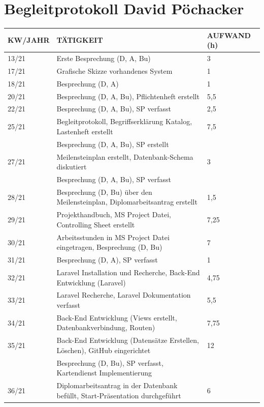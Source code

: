 \section{Begleitprotokoll David Pöchacker}
\begin{table}[h]
	\begin{tabular}{|l|l|l|}
		\hline
		\textbf{KW/JAHR} &     \textbf{TÄTIGKEIT}  & 	\textbf{AUFWAND (h)}    \\ \hline
		
13/21   & Erste Besprechung (D, A, Bu) & 3 	\\ \hline
17/21   & Grafische Skizze vorhandenes System  & 1 	\\ \hline
18/21   & Besprechung (D, A)  & 1 	\\ \hline
20/21   & Besprechung (D, A, Bu), Pflichtenheft erstellt & 5,5 	\\ \hline
22/21   & Besprechung (D, A, Bu), SP verfasst & 2,5 	\\ \hline
25/21   & Begleitprotokoll, Begriffserklärung Katalog, Lastenheft erstellt & 7,5   \\
		& Besprechung (D, A, Bu), SP erstellt & \\ \hline	
27/21   & Meilensteinplan erstellt, Datenbank-Schema diskutiert  & 3 \\
		& Besprechung (D, A, Bu), SP verfasst & 	\\ \hline		
28/21   & Besprechung (D, Bu) über den Meilensteinplan, Diplomarbeitsantrag erstellt  & 1,5 \\ \hline		
29/21   & Projekthandbuch, MS Project Datei, Controlling Sheet erstellt & 7,25 	\\ \hline
30/21   & Arbeitsstunden in MS Project Datei eingetragen, Besprechung (D, Bu) & 7 	\\ \hline
31/21   & Besprechung (D, A), SP verfasst  & 1	\\ \hline
32/21   & Laravel Installation und Recherche, Back-End Entwicklung (Laravel) & 4,75	\\ \hline
33/21   & Laravel Recherche, Laravel Dokumentation verfasst & 5,5	\\ \hline
34/21   & Back-End Entwicklung (Views erstellt, Datenbankverbindung, Routen) & 7,75	\\ \hline
35/21   & Back-End Entwicklung (Datensätze Erstellen, Löschen), GitHub eingerichtet  & 12 \\ 
        & Besprechung (D, Bu), SP verfasst, Kartendienst Implementierung  &	\\ \hline
36/21   & Diplomarbeitsantrag in der Datenbank befüllt, Start-Präsentation durchgeführt & 6 \\

\end{tabular}
\end{table}
